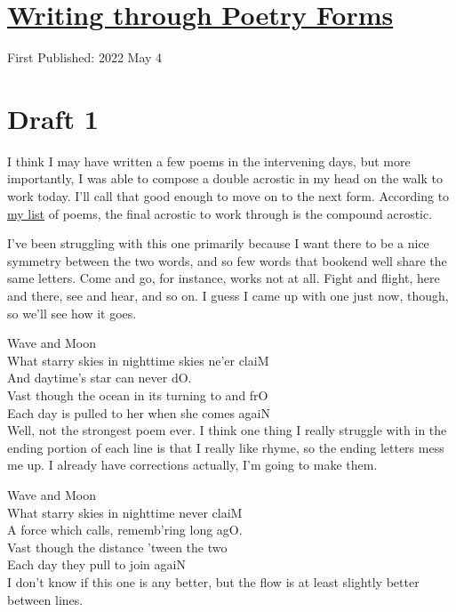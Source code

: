 \documentclass[12pt]{article}[titlepage]
\newcommand{\1}{\={a}}
\newcommand{\2}{\={e}}
\newcommand{\3}{\={\i}}
\newcommand{\4}{\=o}
\newcommand{\5}{\=u}
\newcommand{\6}{\={A}}
\renewcommand{\,}{\textsuperscript{,}}
\begin{document}
\doublespacing
\section{\href{poetry-forms-5.html}{Writing through Poetry Forms}}
First Published: 2022 May 4


\section{Draft 1}
I think I may have written a few poems in the intervening days, but more importantly, I was able to compose a double acrostic in my head on the walk to work today.
I'll call that good enough to move on to the next form.
According to \href{poetry-forms-1.html}{my list} of poems, the final acrostic to work through is the compound acrostic.

I've been struggling with this one primarily because I want there to be a nice symmetry between the two words, and so few words that bookend well share the same letters.
Come and go, for instance, works not at all.
Fight and flight, here and there, see and hear, and so on.
I guess I came up with one just now, though, so we'll see how it goes.

Wave and Moon\\
What starry skies in nighttime skies ne'er claiM\\
And daytime's star can never dO.\\
Vast though the ocean in its turning to and frO\\
Each day is pulled to her when she comes agaiN\\

Well, not the strongest poem ever.
I think one thing I really struggle with in the ending portion of each line is that I really like rhyme, so the ending letters mess me up.
I already have corrections actually, I'm going to make them.

Wave and Moon\\
What starry skies in nighttime never claiM\\
A force which calls, rememb'ring long agO.\\
Vast though the distance 'tween the two\\
Each day they pull to join agaiN\\

I don't know if this one is any better, but the flow is at least slightly better between lines.
\end{document}
